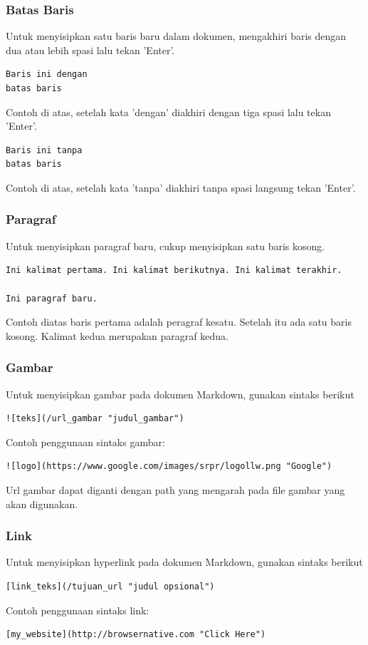 \subsubsection{Batas Baris}
Untuk menyisipkan satu baris baru dalam dokumen, mengakhiri baris dengan dua atau lebih spasi lalu tekan 'Enter'.
\begin{lstlisting}
Baris ini dengan   
batas baris
\end{lstlisting}
Contoh di atas, setelah kata 'dengan' diakhiri dengan tiga spasi lalu tekan 'Enter'.
\begin{lstlisting}
Baris ini tanpa
batas baris
\end{lstlisting}
Contoh di atas, setelah kata 'tanpa' diakhiri tanpa spasi langsung tekan 'Enter'.

\subsubsection{Paragraf}
Untuk menyisipkan paragraf baru, cukup menyisipkan satu baris kosong.
\begin{lstlisting}
Ini kalimat pertama. Ini kalimat berikutnya. Ini kalimat terakhir.

Ini paragraf baru.
\end{lstlisting}
Contoh diatas baris pertama adalah peragraf kesatu. Setelah itu ada satu baris kosong. Kalimat kedua merupakan paragraf kedua.

\subsubsection{Gambar}
Untuk menyisipkan gambar pada dokumen Markdown, gunakan sintaks berikut
\begin{lstlisting}
![teks](/url_gambar "judul_gambar")
\end{lstlisting}
Contoh penggunaan sintaks gambar: 
\begin{lstlisting}
![logo](https://www.google.com/images/srpr/logollw.png "Google")
\end{lstlisting}
Url gambar dapat diganti dengan path yang mengarah pada file gambar yang akan digunakan.

\subsubsection{Link}
Untuk menyisipkan hyperlink pada dokumen Markdown, gunakan sintaks berikut 
\begin{lstlisting}
[link_teks](/tujuan_url "judul opsional")
\end{lstlisting}
Contoh penggunaan sintaks link:
\begin{lstlisting}
[my_website](http://browsernative.com "Click Here")
\end{lstlisting}

